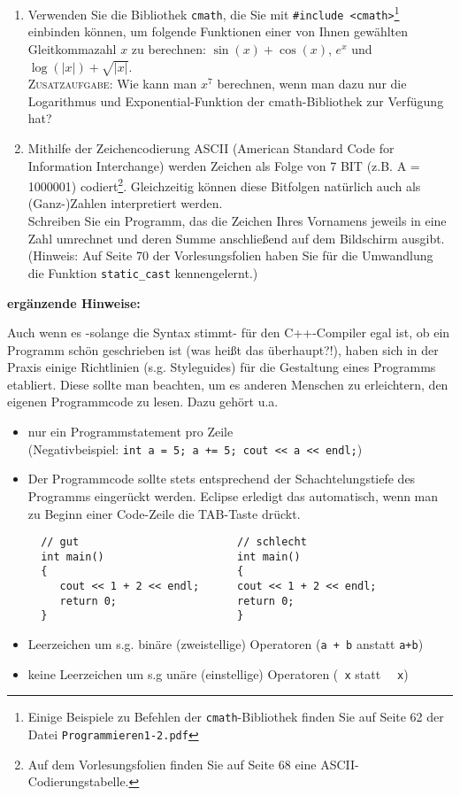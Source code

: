 \documentclass[paper=a4, fontsize=11pt, twoside]{scrartcl}
\begin{document}
\begin{enumerate}[resume]
 \item Verwenden Sie die Bibliothek \texttt{cmath}, die Sie mit \texttt{#include <cmath>}\footnote{Einige Beispiele zu Befehlen der \texttt{cmath}-Bibliothek finden Sie auf Seite 62 der Datei \texttt{Programmieren1-2.pdf}} einbinden können, um folgende Funktionen einer von Ihnen gewählten Gleitkommazahl $x$ zu berechnen: $\sin(x)+\cos(x)$, $e^x$ und $\log(|x|) + \sqrt{|x|}$.   \\
\textsc{Zusatzaufgabe}: Wie kann man $x^7$ berechnen, wenn man dazu nur die Logarithmus und Exponential-Funktion der \textrm{cmath}-Bibliothek zur Verfügung hat?

\item Mithilfe der Zeichencodierung ASCII (American Standard Code for Information Interchange) werden Zeichen als Folge von 7 BIT  (z.B. A = 1000001) codiert\footnote{Auf dem Vorlesungsfolien finden Sie auf Seite 68 eine ASCII-Codierungstabelle.}. Gleichzeitig können diese Bitfolgen natürlich auch als (Ganz-)Zahlen interpretiert werden. \\ Schreiben Sie ein Programm, das die Zeichen Ihres Vornamens jeweils in eine Zahl umrechnet und deren Summe anschließend auf dem Bildschirm ausgibt. (Hinweis: Auf Seite 70 der Vorlesungsfolien haben Sie für die Umwandlung die Funktion \texttt{static_cast} kennengelernt.)
\end{enumerate}

\vspace{1.5cm}
\textbf{ergänzende Hinweise:}
\par
Auch wenn es -solange die Syntax stimmt- für den C++-Compiler egal ist, ob ein Programm schön geschrieben ist (was heißt das überhaupt?!), haben sich in der Praxis einige Richtlinien (s.g. Styleguides) für die Gestaltung eines Programms etabliert. Diese sollte man beachten, um es anderen Menschen zu erleichtern, den eigenen Programmcode zu lesen. Dazu gehört u.a.
\begin{itemize}

 \item nur ein Programmstatement pro Zeile \\
(Negativbeispiel: \texttt{int a = 5; a += 5; cout << a << endl;}) 

\item Der Programmcode sollte stets entsprechend der Schachtelungstiefe des Programms eingerückt werden. Eclipse erledigt das automatisch, wenn man zu Beginn einer Code-Zeile die TAB-Taste drückt. 
  \begin{verbatim}
  // gut                         // schlecht
  int main()                     int main()
  {                              {
     cout << 1 + 2 << endl;      cout << 1 + 2 << endl;
     return 0;                   return 0;
  }                              }
  \end{verbatim}

 \item Leerzeichen um s.g. binäre (zweistellige) Operatoren (\texttt{a + b} anstatt \texttt{a+b})

 \item keine Leerzeichen um s.g unäre (einstellige) Operatoren (\texttt{~x} statt \texttt{~ x})
\end{itemize}
\end{document}
